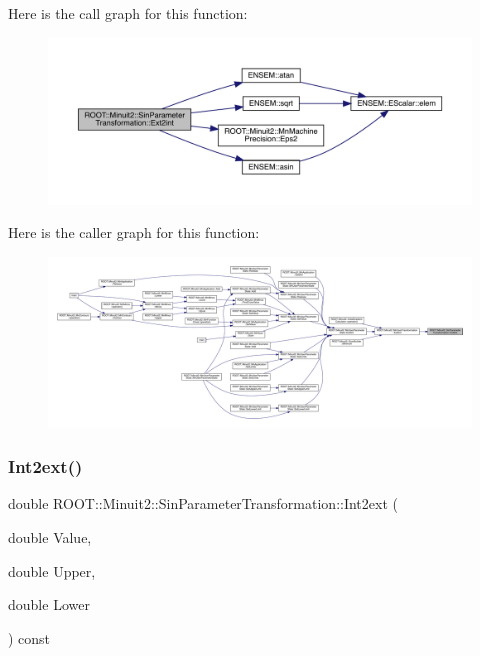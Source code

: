 Here is the call graph for this function\+:
\nopagebreak
\begin{figure}[H]
\begin{center}
\leavevmode
\includegraphics[width=350pt]{de/d62/classROOT_1_1Minuit2_1_1SinParameterTransformation_a5a98af7b966742b4d3c90ab6d6bbeb5a_cgraph}
\end{center}
\end{figure}
Here is the caller graph for this function\+:
\nopagebreak
\begin{figure}[H]
\begin{center}
\leavevmode
\includegraphics[width=350pt]{de/d62/classROOT_1_1Minuit2_1_1SinParameterTransformation_a5a98af7b966742b4d3c90ab6d6bbeb5a_icgraph}
\end{center}
\end{figure}
\mbox{\label{classROOT_1_1Minuit2_1_1SinParameterTransformation_a53590482bc5734d9f079c8c5054d3de6}} 
\subsubsection{\texorpdfstring{Int2ext()}{Int2ext()}\hspace{0.1cm}{\footnotesize\ttfamily [1/3]}}
{\footnotesize\ttfamily double R\+O\+O\+T\+::\+Minuit2\+::\+Sin\+Parameter\+Transformation\+::\+Int2ext (\begin{DoxyParamCaption}\item[{double}]{Value,  }\item[{double}]{Upper,  }\item[{double}]{Lower }\end{DoxyParamCaption}) const}

